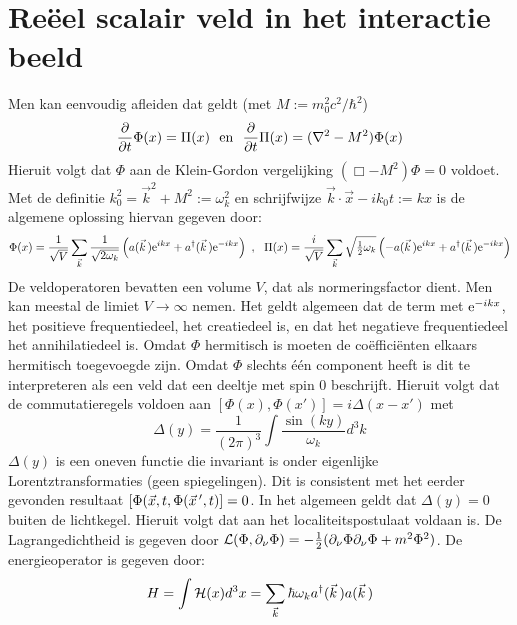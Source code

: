 \documentclass[twoside]{report}
\begin{document}
\section[~~Re\"eel scalair veld in het interactie beeld]{Re\"eel scalair veld in het interactie beeld}
Men kan eenvoudig afleiden dat geldt (met $M:=m_0^2c^2/\hbar^2$)
\[
\frac{\partial }{\partial t}\Phi(x)=\Pi(x)~~\mbox{en}~~\frac{\partial }{\partial t}\Pi(x)=(\nabla^2-M^2)\Phi(x)
\]
Hieruit volgt dat $\Phi$ aan de Klein-Gordon vergelijking $(\Box-M^2)\Phi=0$
voldoet. Met de definitie $k_0^2=\vec{k}^2+M^2:=\omega_k^2$ en schrijfwijze
$\vec{k}\cdot\vec{x}-ik_0t:=kx$ is de algemene oplossing hiervan gegeven door:
\[
\Phi(x)=\frac{1}{\sqrt{V}}\sum_{\vec{k}}\frac{1}{\sqrt{2\omega_k}}
\left(a(\vec{k}\,){\rm e}^{ikx}+a^\dagger(\vec{k}\,){\rm e}^{-ikx}\right)
~,~~
\Pi(x)=\frac{i}{\sqrt{V}}\sum_{\vec{k}}\sqrt{\mbox{$\frac{1}{2}$}\omega_k}
\left(-a(\vec{k}\,){\rm e}^{ikx}+a^\dagger(\vec{k}\,){\rm e}^{-ikx}\right)
\]
De veldoperatoren bevatten een volume $V$, dat als normeringsfactor dient.
Men kan meestal de limiet $V\rightarrow\infty$ nemen.
\npar
Het geldt algemeen dat de term met ${\rm e}^{-ikx}$, het positieve
frequentiedeel, het creatiedeel is, en dat het negatieve frequentiedeel het
annihilatiedeel is.
\npar
Omdat $\Phi$ hermitisch is moeten de co\"effici\"enten elkaars hermitisch
toegevoegde zijn. Omdat $\Phi$ slechts \'e\'en component heeft is dit te
interpreteren als een veld dat een deeltje met spin 0 beschrijft. Hieruit
volgt dat de commutatieregels voldoen aan $[\Phi(x),\Phi(x')]=i\Delta(x-x')$
met
\[
\Delta(y)=\frac{1}{(2\pi)^3}\int\frac{\sin(ky)}{\omega_k}d^3k
\]
$\Delta(y)$ is een oneven functie die invariant is onder eigenlijke
Lorentztransformaties (geen spiegelingen). Dit is consistent met het eerder
gevonden resultaat $[\Phi(\vec{x},t,\Phi(\vec{x}\,',t)]=0$. In het algemeen
geldt dat $\Delta(y)=0$ buiten de lichtkegel. Hieruit volgt dat aan het
localiteitspostulaat voldaan is.
\npar
De Lagrangedichtheid is gegeven door
${\cal L}(\Phi,\partial_\nu\Phi)=-\mbox{$\frac{1}{2}$}(\partial_\nu\Phi\partial_\nu\Phi+m^2\Phi^2)$.
De energieoperator is gegeven door:
\[
H=\int{\cal H}(x)d^3x=\sum_{\vec{k}}\hbar\omega_ka^\dagger(\vec{k}\,)a(\vec{k}\,)
\]
\end{document}
